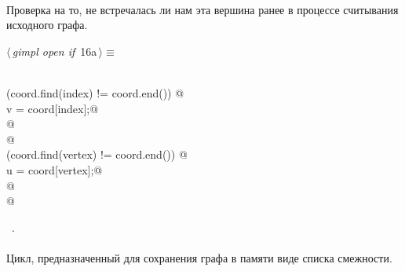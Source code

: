 \documentclass[12pt]{article}
\begin{document}
\paragraph{}
Проверка на то, не встречалась ли нам эта вершина ранее в процессе считывания исходного графа.
\begin{flushleft} \small
\begin{minipage}{\linewidth}\label{scrap25}\raggedright\small
{} $\langle\,${\itshape gimpl open if}\nobreak\ {\footnotesize {16a}}$\,\rangle\equiv$
\vspace{-1ex}
\begin{list}{}{} \item
\mbox{}\verb@@\\
\mbox{}\verb@if (coord.find(index) != coord.end()) {@\\
\mbox{}\verb@    v = coord[index];@\\
\mbox{}\verb@} @\\
\mbox{}@\\
\mbox{}\verb@if (coord.find(vertex) != coord.end()) {@\\
\mbox{}\verb@    u = coord[vertex];@\\
\mbox{}\verb@}@\\
\mbox{}@\\
\mbox{}\verb@@{\NWsep}
\end{list}
\vspace{-1.5ex}
\footnotesize
\begin{list}{}{\setlength{\itemsep}{-\parsep}\setlength{\itemindent}{-\leftmargin}}
\item \NWtxtMacroRefIn\ .

\item{}
\end{list}
\end{minipage}\vspace{4ex}
\end{flushleft}
\paragraph{}
Цикл, предназначенный для сохранения графа в памяти виде списка смежности.
\end{document}
